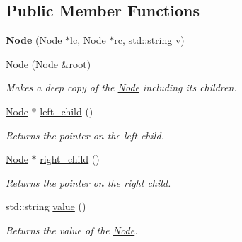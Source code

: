 \subsection*{Public Member Functions}
\begin{DoxyCompactItemize}
\item 
\mbox{\label{classNode_aeeda019b6480a7ae5713890f802b7055}} 
{\bfseries Node} (\hyperlink{classNode}{Node} $\ast$lc, \hyperlink{classNode}{Node} $\ast$rc, std\+::string v)
\item 
\mbox{\label{classNode_a0089889f0d4e22f1cbb707ca9e1c27ea}} 
\hyperlink{classNode_a0089889f0d4e22f1cbb707ca9e1c27ea}{Node} (\hyperlink{classNode}{Node} \&root)
\begin{DoxyCompactList}\small\item\em Makes a deep copy of the \hyperlink{classNode}{Node} including its children. \end{DoxyCompactList}\item 
\mbox{\label{classNode_a1326a789dd57a0219d6c4927573c4965}} 
\hyperlink{classNode}{Node} $\ast$ \hyperlink{classNode_a1326a789dd57a0219d6c4927573c4965}{left\+\_\+child} ()
\begin{DoxyCompactList}\small\item\em Returns the pointer on the left child. \end{DoxyCompactList}\item 
\mbox{\label{classNode_a3c9dba1de9c55937d71598d4ba06314b}} 
\hyperlink{classNode}{Node} $\ast$ \hyperlink{classNode_a3c9dba1de9c55937d71598d4ba06314b}{right\+\_\+child} ()
\begin{DoxyCompactList}\small\item\em Returns the pointer on the right child. \end{DoxyCompactList}\item 
\mbox{\label{classNode_a932c934ef9fe76a2839db304529c7769}} 
std\+::string \hyperlink{classNode_a932c934ef9fe76a2839db304529c7769}{value} ()
\begin{DoxyCompactList}\small\item\em Returns the value of the \hyperlink{classNode}{Node}. \end{DoxyCompactList}\item 
\mbox{\label{classNode_a50c34dde7898f3992c72eef3df00917b}} 

\end{DoxyCompactItemize}
